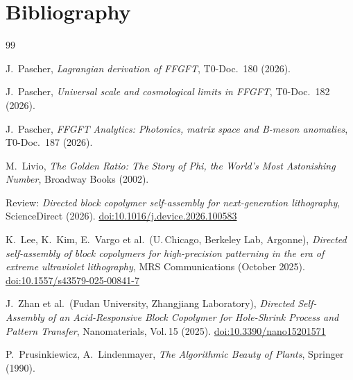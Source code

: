 \newpage
\section*{Bibliography}

\begin{thebibliography}{99}

J.~Pascher, \textit{Lagrangian derivation of FFGFT}, T0-Doc.~180 (2026).

J.~Pascher, \textit{Universal scale and cosmological limits in FFGFT},
T0-Doc.~182 (2026).

J.~Pascher, \textit{FFGFT Analytics: Photonics, matrix space and B-meson anomalies},
T0-Doc.~187 (2026).

M.~Livio, \textit{The Golden Ratio: The Story of Phi, the World's Most
Astonishing Number}, Broadway Books (2002).

Review: \textit{Directed block copolymer self-assembly for next-generation lithography},
ScienceDirect (2026).
\href{https://doi.org/10.1016/j.device.2026.100583}{doi:10.1016/j.device.2026.100583}

K.~Lee, K.~Kim, E.~Vargo et al.\ (U.\,Chicago, Berkeley Lab, Argonne),
\textit{Directed self-assembly of block copolymers for high-precision patterning
in the era of extreme ultraviolet lithography},
MRS Communications (October 2025).
\href{https://doi.org/10.1557/s43579-025-00841-7}{doi:10.1557/s43579-025-00841-7}

J.~Zhan et al.\ (Fudan University, Zhangjiang Laboratory),
\textit{Directed Self-Assembly of an Acid-Responsive Block Copolymer
for Hole-Shrink Process and Pattern Transfer},
Nanomaterials, Vol.\,15 (2025).
\href{https://doi.org/10.3390/nano15201571}{doi:10.3390/nano15201571}

P.~Prusinkiewicz, A.~Lindenmayer,
\textit{The Algorithmic Beauty of Plants},
Springer (1990).

\end{thebibliography}
